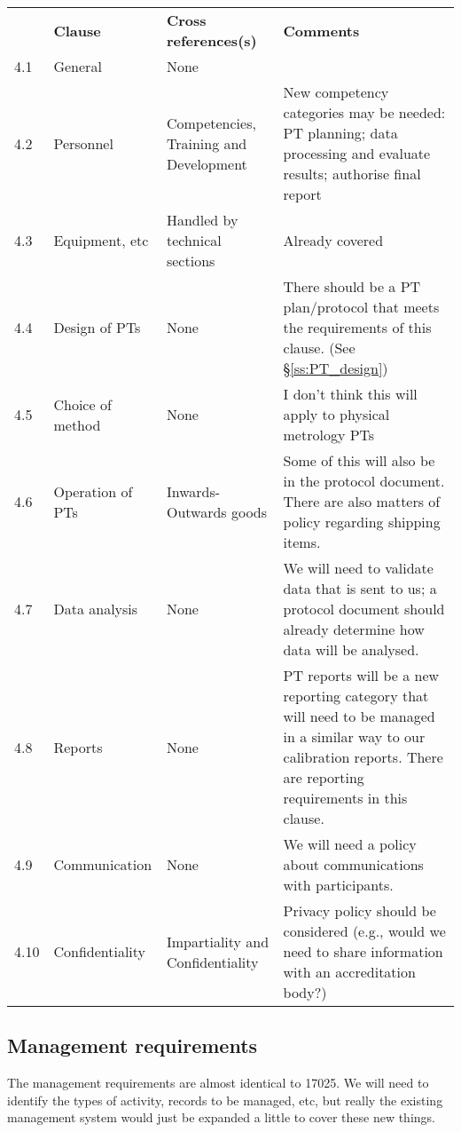 \begin{center}
{\renewcommand*{\arraystretch}{1.4}
\begin{tabular}{p{1em}p{10em}p{12em}p{16em}}
	\rowcolor[rgb]{ 0,  0,  0} 
	\textcolor[rgb]{ 1,  1,  1}{} & 
	\textcolor[rgb]{ 1,  1,  1}{\textbf{Clause}} & 
	\textcolor[rgb]{ 1,  1,  1}{\textbf{Cross references(s)}} &
	\textcolor[rgb]{ 1,  1,  1}{\textbf{Comments}} \\
4.1 & General & None &   \\
4.2	& Personnel &
Competencies, Training and Development \cite[\S\ref*{QM-s:competencies_professional_development}]{MSL_Quality_Manual} & 
New competency categories may be needed: PT planning; data processing and evaluate results; authorise final report \\
4.3	& Equipment, etc & Handled by technical sections	& Already covered \\
4.4	& Design of PTs	& None	& There should be a PT plan/protocol that meets the requirements of this clause. (See \S\ref{ss:PT_design}) \\
4.5	& Choice of method	& None	& I don't think this will apply to physical metrology PTs \\
4.6	& Operation of PTs	& Inwards-Outwards goods \cite[\S\ref*{QM-s:inwards_outwards_goods}]{MSL_Quality_Manual} & 
Some of this will also be in the protocol document. There are also matters of policy regarding shipping items. \\
4.7	& Data analysis	& None	& We will need to validate data that is sent to us; a protocol document should already determine how data will be analysed.\\
4.8	& Reports	& None	& PT reports will be a new reporting category that will need to be managed in a similar way to our calibration reports. There are reporting requirements in this clause.\\
4.9	& Communication	& None	& We will need a policy about communications with participants.\\
4.10	& Confidentiality	& Impartiality \cite[\S\ref*{QM-sssp:impartiality}]{MSL_Quality_Manual} and Confidentiality \cite[\S\ref*{QM-sss:confidentiality}]{MSL_Quality_Manual} & Privacy policy should be considered  (e.g., would we need to share information with an accreditation body?)

\end{tabular} } 
\end{center}

\newpage
\subsection{Management requirements}
The management requirements are almost identical to 17025. We will need to identify the types of activity, records to be managed, etc, but really the existing management system would just be expanded a little to cover these new things.

